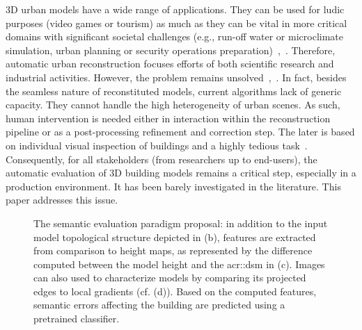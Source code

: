 \documentclass[runningheads]{llncs}
\begin{document}
    3D urban models have a wide range of applications. They can be used for ludic purposes (video games or tourism) as much as they can be vital in more critical domains with significant societal challenges (e.g., run-off water or microclimate simulation, urban planning or security operations preparation)~\cite{Biljecki2015},~\cite{Musialski2012}. Therefore, automatic urban reconstruction focuses efforts of both scientific research and industrial activities. However, the problem remains unsolved~\cite{Musialski2012},~\cite{rottensteiner2014results}. In fact, besides the seamless nature of reconstituted models, current algorithms lack of generic capacity. They cannot handle the high heterogeneity of urban scenes. As such, human intervention is needed either in interaction within the reconstruction pipeline or as a post-processing refinement and correction step. The later is based on individual visual inspection of buildings and a highly tedious task~\cite{Musialski2012}. Consequently, for all stakeholders (from researchers up to end-users), the automatic evaluation of 3D building models remains a critical step, especially in a production environment. It has been barely investigated in the literature. This paper addresses this issue.

	\begin{figure}
        \begin{center}
            
           \vspace{-1.3cm} \caption{\label{fig::pipeline} The semantic evaluation paradigm proposal: in addition to the input model topological structure depicted in (b), features are extracted from comparison to height maps, as represented by the difference computed between the model height and the \acrlong{acr::dsm} in (c). Images can also used to characterize models by comparing its projected edges to local gradients (cf. (d)). Based on the computed features, semantic errors affecting the building are predicted using a pretrained classifier.}
        \end{center}
    \end{figure}
\end{document}

